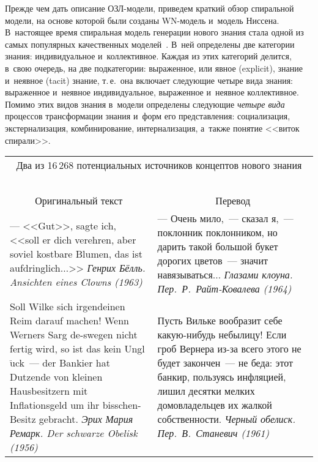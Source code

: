 {\begin{multicols}{2}
  Прежде чем дать описание ОЗЛ-мо\-де\-ли, приведем краткий обзор 
спиральной модели, на основе которой были созданы WN-мо\-дель и~модель 
Ниссена. В~настоящее время спиральная модель генерации нового знания стала 
одной из самых популярных качественных моделей~\cite{4-zac, 6-zac}. В~ней 
определены две категории знания: индивидуальное и~коллективное. Каждая из 
этих категорий делится, в~свою очередь, на две подкатегории: выраженное, или 
явное (explicit), знание и~неявное (tacit) знание, т.\,е.\ она включает следующие 
четыре вида знания: выраженное и~неявное индивидуальное, выраженное 
и~неявное коллективное. Помимо этих видов знания в~модели определены 
следующие \textit{четыре вида} процессов трансформации знания и~форм его 
представления: социализация, экстернализация, комбинирование, 
интернализация, а~также понятие <<виток спирали>>.

  \begin{table*}[b]\small
  \vspace*{6pt}
  \begin{center}
  \begin{tabular}{|p{78mm}|p{78mm}|}
  \multicolumn{2}{c}{Два из 16\,268 потенциальных источников концептов нового знания}\\
  \multicolumn{2}{c}{\ }\\[-6pt]
  \hline
\multicolumn{1}{|c|}{Оригинальный текст}&\multicolumn{1}{c|}{Перевод}\\
\hline
  --- <<Gut>>, sagte ich, <<soll er dich verehren, aber soviel kostbare Blumen, das ist 
aufdringlich$\ldots$>>\newline
  \textit{Генрих Бёлль. Ansichten eines Clowns (1963)}&--- Очень мило,~--- сказал я,~--- 
поклонник поклонником, но дарить такой большой букет дорогих цветов~--- значит 
навязываться$\ldots$\newline
  \textit{Глазами клоуна. Пер.\  
Р.~Райт-Ковалева (1964)}\\
  \hline
  Soll Wilke sich irgendeinen Reim darauf machen! Wenn Werners Sarg de-swegen nicht fertig 
wird, so ist das kein Ungl$\ddot{\mbox{u}}$ck~--- der Bankier hat Dutzende von kleinen 
Hausbesitzern mit Inflationsgeld um ihr bisschen-Besitz gebracht.\newline
  \textit{Эрих Мария Ремарк. Der schwarze Obelisk (1956)}
  &Пусть Вильке вообразит себе ка\-кую-ни\-будь небылицу! Если гроб Вернера из-за всего 
этого не будет закончен~--- не беда: этот банкир, пользуясь инфляцией, лишил десятки 
мелких домовладельцев их жалкой собственности.\newline
  \textit{Черный обелиск. Пер.\ В.~Станевич (1961)}\\
  \hline
  \end{tabular}
  \end{center}
  \end{table*}
  

\end{multicols}}
